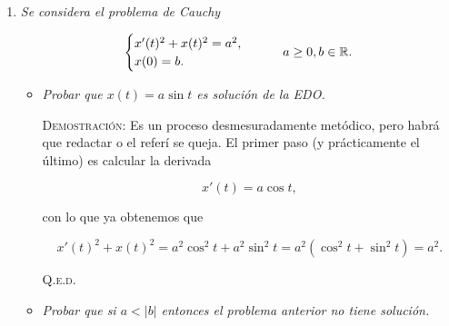 \documentclass{article}
\begin{document}
\begin{enumerate}
    Para probar que es una condición necesaria, supongamos que $D$ no es denso en $\mathbb{R}$ y veamos que no es solución de la segunda EDO. 
    
    En consecuencia, como $D$ no es denso en $\mathbb{R}$, $\overline{D} \neq \mathbb{R}$ o, lo que es lo mismo, existen $t_0, r \in \mathbb{R}$ tales que $(t_0 - r, t_0 + r) \cap D = \emptyset$. Por tanto, para todo $t \in (t_0 - r, t_0 + r)$
    se tiene $x'(t) = 0$, con lo que deducimos que $x$ es constante en dicho intervalo.

    Al ser constante, y sabiendo que $x'(t)^2 + x(t)^2 = k$ con $x'(t) = 0$, obtenemos que $x(t) = \sqrt{k} > 0$ en todo el intervalo\footnote{También podría tomar la solución negativa $-\sqrt{k}$, pero no afecta al argumento.}. Con esta información llegamos fácilmente a que no satisface $x''(t) + x(t) = 0$,
    pues $x''(t) = 0$ mientras que $x(t) > 0$. $\hfill\square$

    \vspace{12px}

    \item \textit{Se considera el problema de Cauchy}
    
    \[
    \begin{cases}
        x'(t)^2 + x(t)^2 = a^2, \\
        x(0) = b.
    \end{cases}
    \hspace{20px} a \geq 0, b \in \mathbb{R}.
    \]

    \begin{itemize}
        \item \textit{Probar que $x(t) = a\sin t$ es solución de la EDO.}
        
        \vspace{7px}

        \textsc{Demostración:} Es un proceso desmesuradamente metódico, pero habrá que redactar o 
        el referí se queja. El primer paso (y prácticamente el último) es calcular la derivada

        \[x'(t) = a\cos t,\]

        con lo que ya obtenemos que

        \[x'(t)^2 + x(t)^2 = a^2\cos^2t + a^2\sin^2t = a^2(\cos^2t + \sin^2t) = a^2.\]

        \hfill{\textsc{Q.e.d.}}

        \vspace{7px}

        \item \textit{Probar que si $a < |b|$ entonces el problema anterior no tiene solución.}


\end{itemize}
\end{enumerate}
\end{document}

